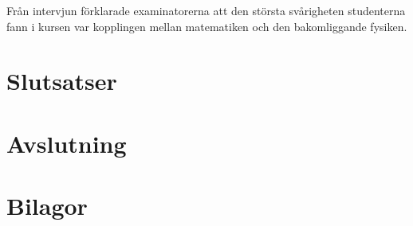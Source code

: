 \documentclass[]{article}
\begin{document}



Från intervjun förklarade examinatorerna att den största svårigheten studenterna
fann i kursen var kopplingen mellan matematiken och den bakomliggande fysiken.



\section{Slutsatser}

\section{Avslutning}
%

\newpage

\printbibliography

\section{Bilagor}
\end{document}
